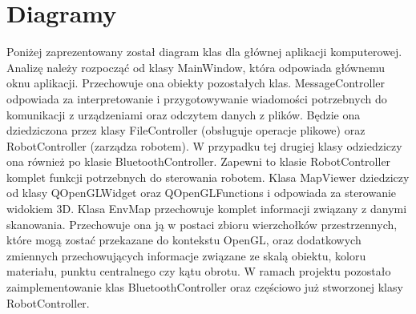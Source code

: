 \documentclass[a4paper,12pt]{article}
\begin{document}
\section{Diagramy}
Poniżej zaprezentowany został diagram klas dla głównej aplikacji komputerowej. 
Analizę należy rozpocząć od klasy MainWindow, która odpowiada głównemu oknu aplikacji. Przechowuje ona obiekty pozostałych klas. 
MessageController odpowiada za interpretowanie i przygotowywanie wiadomości potrzebnych do komunikacji z urządzeniami oraz odczytem danych z plików.
Będzie ona dziedziczona przez klasy FileController (obsługuje operacje plikowe) oraz RobotController (zarządza robotem). 
W przypadku tej drugiej klasy odziedziczy ona również po klasie BluetoothController. Zapewni to klasie RobotController komplet funkcji potrzebnych
do sterowania robotem. 
Klasa MapViewer dziedziczy od klasy QOpenGLWidget oraz QOpenGLFunctions i odpowiada za sterowanie widokiem 3D.
Klasa EnvMap przechowuje komplet informacji związany z danymi skanowania. Przechowuje ona ją w postaci zbioru wierzchołków przestrzennych, które mogą zostać przekazane do kontekstu OpenGL, oraz dodatkowych zmiennych przechowujących informacje związane ze skalą obiektu, koloru materiału, punktu centralnego czy kątu obrotu.
\newline
W ramach projektu pozostało zaimplementowanie klas BluetoothController oraz częściowo już stworzonej klasy RobotController.




\end{document}
